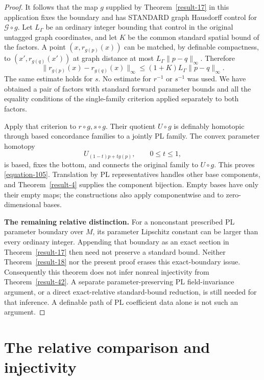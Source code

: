 \documentclass[11pt,a4paper]{article}
\theoremstyle{definition}
\begin{document}
\begin{proof}
It follows that the map $g$ supplied by Theorem~\ref{result-17} in this
application fixes the boundary and has STANDARD graph
Hausdorff control for $\mathcal G\circ g$. Let $L_\Gamma$
be an ordinary integer bounding that control in the original
untagged graph coordinates, and let $K$ be the common standard
spatial bound of the factors. A point $(x,r_{g(p)}(x))$ can
be matched, by definable compactness, to
$(x',r_{g(q)}(x'))$ at graph distance at most
$L_\Gamma\|p-q\|_\infty$. Therefore
\begin{equation}
 \|r_{g(p)}(x)-r_{g(q)}(x)\|_\infty
 \le(1+K)L_\Gamma\|p-q\|_\infty.
 \label{equation-113}
\end{equation}
The same estimate holds for $s$. No estimate for $r^{-1}$ or
$s^{-1}$ was used. We have obtained a pair of factors with
standard forward parameter bounds and all the equality
conditions of the single-family criterion applied separately to both factors.

Apply that criterion to $r\circ g,s\circ g$. Their quotient
$U\circ g$ is definably homotopic through based concordance
families to a jointly PL family. The convex parameter homotopy
\begin{equation}
 U_{(1-t)p+t g(p)},\qquad 0\le t\le1,
 \label{equation-114}
\end{equation}
is based, fixes the bottom, and connects the original family
to $U\circ g$. This proves \eqref{equation-105}. Translation by PL
representatives handles other base components, and Theorem~\ref{result-4}
supplies the component bijection. Empty bases have only their
empty maps; the constructions also apply componentwise and
to zero-dimensional bases.

\textbf{The remaining relative distinction.}\quad
For a nonconstant prescribed PL parameter boundary over $M$,
its parameter Lipschitz constant can be larger than every
ordinary integer. Appending that boundary as an exact section
in Theorem~\ref{result-17} then need not preserve a standard bound. Neither
Theorem~\ref{result-18} nor the present proof erases this exact-boundary issue.
Consequently this theorem does not infer nonreal injectivity
from Theorem~\ref{result-42}. A separate parameter-preserving PL field-invariance
argument, or a direct exact-relative standard-bound reduction,
is still needed for that inference. A definable path of PL
coefficient data alone is not such an argument.
\end{proof}\section{The relative comparison and injectivity}
\end{document}
